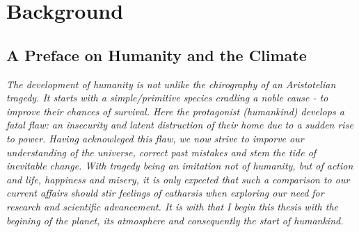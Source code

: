 \section{Background}
\subsection{A Preface on Humanity and the Climate}
\begin{flushleft}\emph{
The development of humanity is not unlike the chirography of an Aristotelian tragedy. It starts with a simple/primitive species cradling a noble cause - to improve their chances of survival. Here the protagonist (humankind) develops a fatal flaw: an insecurity and latent distruction of their home due to a sudden rise to power.
Having acknowleged this flaw, we now strive to imporve our understanding of the universe, correct past mistakes and stem the tide of inevitable change. \vspace{\baselineskip}\linebreak
With tragedy being an imitation not of humanity, but of action and life, happiness and misery, it is only expected that such a comparison to our current affairs should stir feelings of catharsis when exploring our need for research and scientific advancement.
It is with that I begin this thesis with the begining of the planet, its atmosphere and consequently the start of humankind.
}
\end{flushleft}

